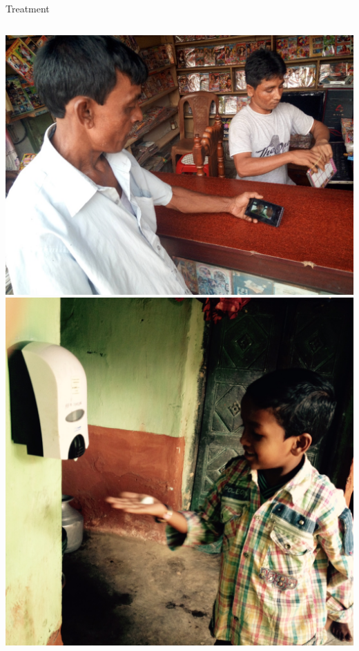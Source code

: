 \documentclass[aspectratio=169]{beamer}
\begin{document}
\begin{frame}{Treatment}
\begin{columns}
	\includegraphics[scale=0.09]{img-014.png}
	\includegraphics[scale=0.07]{img-020.png}
	\end{columns}
\end{frame}
\end{document}
